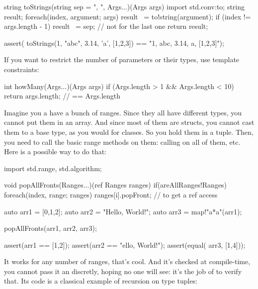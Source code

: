 \begin{dcode}
string toStrings(string sep = ", ", Args...)(Args args)
{
    import std.conv:to;
    string result;
    foreach(index, argument; args)
    {
        result ~= to!string(argument);
        if (index != args.length - 1) result ~= sep; // not for the last one
    }
    return result;
}

assert( toStrings(1, "abc", 3.14, 'a', [1,2,3]) 
              == "1, abc, 3.14, a, [1,2,3]"); 
\end{dcode}

If you want to restrict the number of parameters or their types, use template constraints:

\begin{dcode}
int howMany(Args...)(Args args) if (Args.length > 1 && Args.length < 10)
{
    return args.length; // == Args.length
}
\end{dcode}

Imagine you a have a bunch of ranges. Since they all have different types, you cannot put them in an array. And since most of them are structs, you cannot cast them to a base type, as you would for classes. So you hold them in a tuple. Then, you need to call the basic range methods on them: calling  on all of them, etc. Here is a possible way to do that:

\begin{dcode}
import std.range, std.algorithm;

void popAllFronts(Ranges...)(ref Ranges ranges) 
    if(areAllRanges!Ranges)
{
    foreach(index, range; ranges) 
        ranges[i].popFront; // to get a ref access
}

auto arr1 = [0,1,2];
auto arr2 = "Hello, World!";
auto arr3 = map!"a*a"(arr1);

popAllFronts(arr1, arr2, arr3);

assert(arr1 == [1,2]);
assert(arr2 == "ello, World!");
assert(equal( arr3, [1,4])); 
\end{dcode}

It works for any number of ranges, that's cool. And it's checked at compile-time, you cannot pass it an  discretly, hoping no one will see: it's the job of  to verify that. Its code is a classical example of recursion on type tuples:


